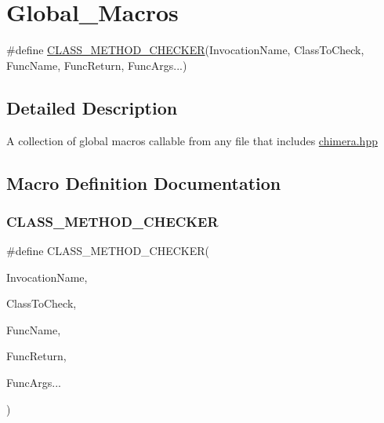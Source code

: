 \hypertarget{group___global___macros}{}\section{Global\+\_\+\+Macros}
\label{group___global___macros}
\begin{DoxyCompactItemize}
\item 
\#define \mbox{\hyperlink{group___global___macros_ga117fd210209a1987ea0f808d74d930f7}{C\+L\+A\+S\+S\+\_\+\+M\+E\+T\+H\+O\+D\+\_\+\+C\+H\+E\+C\+K\+ER}}(Invocation\+Name,  Class\+To\+Check,  Func\+Name,  Func\+Return,  Func\+Args...)
\end{DoxyCompactItemize}


\subsection{Detailed Description}
A collection of global macros callable from any file that includes \mbox{\hyperlink{chimera_8hpp}{chimera.\+hpp}} 

\subsection{Macro Definition Documentation}
\mbox{\label{group___global___macros_ga117fd210209a1987ea0f808d74d930f7}} 
\subsubsection{\texorpdfstring{C\+L\+A\+S\+S\+\_\+\+M\+E\+T\+H\+O\+D\+\_\+\+C\+H\+E\+C\+K\+ER}{CLASS\_METHOD\_CHECKER}}
{\footnotesize\ttfamily \#define C\+L\+A\+S\+S\+\_\+\+M\+E\+T\+H\+O\+D\+\_\+\+C\+H\+E\+C\+K\+ER(\begin{DoxyParamCaption}\item[{}]{Invocation\+Name,  }\item[{}]{Class\+To\+Check,  }\item[{}]{Func\+Name,  }\item[{}]{Func\+Return,  }\item[{}]{Func\+Args... }\end{DoxyParamCaption})}

